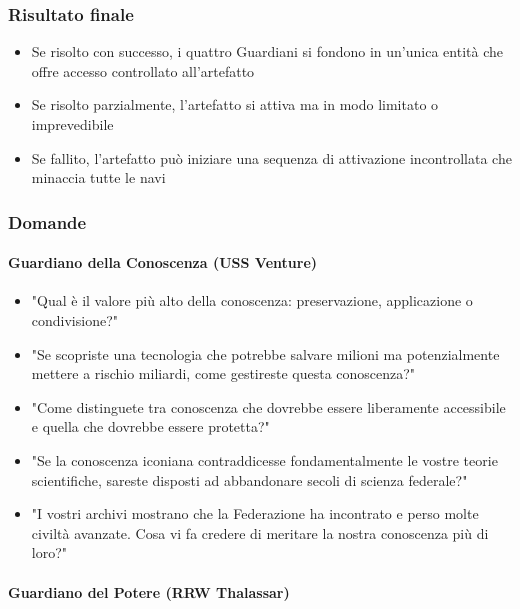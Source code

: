 \documentclass[letterpaper,twocolumn,openany,nodeprecatedcode]{dndbook}
\begin{document}
\subsubsection{Risultato finale}

\begin{itemize}
    \item Se risolto con successo, i quattro Guardiani si fondono in un'unica entità che offre accesso controllato all'artefatto
    \item Se risolto parzialmente, l'artefatto si attiva ma in modo limitato o imprevedibile
    \item Se fallito, l'artefatto può iniziare una sequenza di attivazione incontrollata che minaccia tutte le navi
\end{itemize}

\subsubsection{Domande}
\paragraph{Guardiano della Conoscenza (USS Venture)}

\begin{itemize}
    \item "Qual è il valore più alto della conoscenza: preservazione, applicazione o condivisione?"
    \item "Se scopriste una tecnologia che potrebbe salvare milioni ma potenzialmente mettere a rischio miliardi, come gestireste questa conoscenza?"
    \item "Come distinguete tra conoscenza che dovrebbe essere liberamente accessibile e quella che dovrebbe essere protetta?"
    \item "Se la conoscenza iconiana contraddicesse fondamentalmente le vostre teorie scientifiche, sareste disposti ad abbandonare secoli di scienza federale?"
    \item "I vostri archivi mostrano che la Federazione ha incontrato e perso molte civiltà avanzate. Cosa vi fa credere di meritare la nostra conoscenza più di loro?"
\end{itemize}

\paragraph{Guardiano del Potere (RRW Thalassar)}
\end{document}
